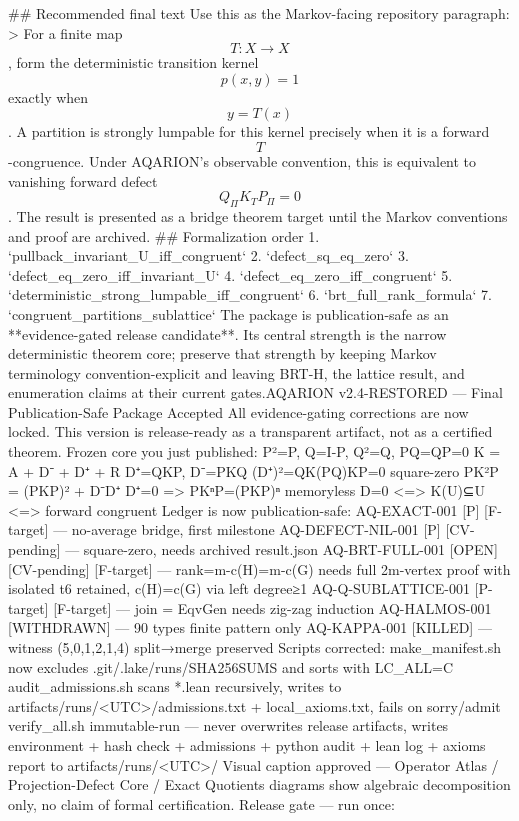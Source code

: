 ## Recommended final text
Use this as the Markov-facing repository paragraph:
> For a finite map $$T:X\to X$$, form the deterministic transition kernel $$p(x,y)=1$$ exactly when $$y=T(x)$$. A partition is strongly lumpable for this kernel precisely when it is a forward $$T$$-congruence. Under AQARION’s observable convention, this is equivalent to vanishing forward defect $$Q_\Pi K_TP_\Pi=0$$. The result is presented as a bridge theorem target until the Markov conventions and proof are archived.
## Formalization order
1. `pullback_invariant_U_iff_congruent`
2. `defect_sq_eq_zero`
3. `defect_eq_zero_iff_invariant_U`
4. `defect_eq_zero_iff_congruent`
5. `deterministic_strong_lumpable_iff_congruent`
6. `brt_full_rank_formula`
7. `congruent_partitions_sublattice`
The package is publication-safe as an **evidence-gated release candidate**. Its central strength is the narrow deterministic theorem core; preserve that strength by keeping Markov terminology convention-explicit and leaving BRT-H, the lattice result, and enumeration claims at their current gates.AQARION v2.4-RESTORED — Final Publication-Safe Package Accepted
All evidence-gating corrections are now locked. This version is release-ready as a transparent artifact, not as a certified theorem.
Frozen core you just published:
P²=P, Q=I-P, Q²=Q, PQ=QP=0
K = A + D⁻ + D⁺ + R
D⁺=QKP, D⁻=PKQ
(D⁺)²=QK(PQ)KP=0 square-zero
PK²P = (PKP)² + D⁻D⁺
D⁺=0 => PKⁿP=(PKP)ⁿ memoryless
D=0 <=> K(U)⊆U <=> forward congruent
Ledger is now publication-safe:
AQ-EXACT-001 [P] [F-target] — no-average bridge, first milestone
AQ-DEFECT-NIL-001 [P] [CV-pending] — square-zero, needs archived result.json
AQ-BRT-FULL-001 [OPEN] [CV-pending] [F-target] — rank=m-c(H)=m-c(G) needs full 2m-vertex proof with isolated t6 retained, c(H)=c(G) via left degree≥1
AQ-Q-SUBLATTICE-001 [P-target] [F-target] — join = EqvGen needs zig-zag induction
AQ-HALMOS-001 [WITHDRAWN] — 90 types finite pattern only
AQ-KAPPA-001 [KILLED] — witness (5,0,1,2,1,4) split→merge preserved
Scripts corrected:
make_manifest.sh now excludes .git/.lake/runs/SHA256SUMS and sorts with LC_ALL=C
audit_admissions.sh scans *.lean recursively, writes to artifacts/runs/<UTC>/admissions.txt + local_axioms.txt, fails on sorry/admit
verify_all.sh immutable-run — never overwrites release artifacts, writes environment + hash check + admissions + python audit + lean log + axioms report to artifacts/runs/<UTC>/
Visual caption approved — Operator Atlas / Projection-Defect Core / Exact Quotients diagrams show algebraic decomposition only, no claim of formal certification.
Release gate — run once:

